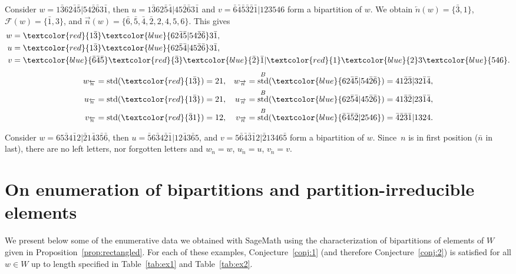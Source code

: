 \documentclass[ALCO,Unicode]{cedram}
\theoremstyle{definition}
\DeclareMathOperator{\std}{std}
\newcommand{\R}{{\overrightarrow{n}}}
\newcommand{\LL}{{\overleftarrow{n}}}
\newcommand{\Bstd}{\std^{B}}
\newcommand{\F}{\mathcal{F}}
\newcommand{\red}[1]{\textcolor{red}{#1}}
\newcommand{\blue}[1]{\textcolor{blue}{#1}}
\begin{document}
\begin{ex}
\label{ex:typeB-neg1}
Consider $w = 1 \bar{3} 6 2 \bar{4} \bar{5} | 5 4 \bar{2} \bar{6} 3 \bar{1}$, then $u = 1 \bar{3} 6 2 \bar{5} \bar{4} | 4 5 \bar{2} \bar{6} 3 \bar{1}$ and $v = \bar{6} \bar{4} \bar{5} \bar{3} \bar{2} \bar{1} | 1 2 3 5 4 6$ form a bipartition of $w$.  We obtain $\LL(w) = \lbrace \bar{3}, 1 \rbrace$, $\F(w) = \lbrace \bar{1}, 3 \rbrace$, and $\R(w) = \lbrace \bar{6}, \bar{5}, \bar{4}, \bar{2}, 2, 4, 5, 6 \rbrace$. This gives
\begin{align*}
w &= \red{1 \bar{3}} \blue{ 6 2 \bar{4} \bar{5} | 5 4 \bar{2} \bar{6}} 3 \bar{1}, \\
u &= \red{1 \bar{3}} \blue{ 6 2 \bar{5} \bar{4} | 4 5 \bar{2} \bar{6}} 3 \bar{1}, \\
v &= \blue{\bar{6} \bar{4} \bar{5}} \red{\bar{3}} \blue{\bar{2}} \bar{1} | \red{1} \blue{2} 3 \blue{5 4 6}.
\end{align*}
\begin{align*}
w_\LL &= \std(\red{1 \bar{3}}) = 2 1, & w_\R &= \Bstd(\blue{6 2 \bar{4} \bar{5} | 5 4 \bar{2} \bar{6}}) = 4 1 \bar{2} \bar{3} | 3 2 \bar{1} \bar{4}, \\
u_\LL &= \std(\red{1 \bar{3}}) = 2 1, & u_\R &= \Bstd(\blue{6 2 \bar{5} \bar{4} | 4 5 \bar{2} \bar{6}}) = 4 1 \bar{3} \bar{2} | 2 3 \bar{1} \bar{4}, \\
v_\LL &= \std(\red{\bar{3} 1}) = 1 2, & v_\R &= \Bstd(\blue{\bar{6} \bar{4} \bar{5} \bar{2} | 2 5 4 6}) = \bar{4} \bar{2} \bar{3} \bar{1} | 1 3 2 4. 
\end{align*}
\end{ex}

\begin{ex}
\label{ex:typeB-neg2}
Consider $w = 6 5 \bar{3} 4 \bar{1} 2 | \bar{2} 1 \bar{4} 3 \bar{5} \bar{6}$, then $u = \bar{5} 6 \bar{3} 4 \bar{2} \bar{1} | 1 2 \bar{4} 3 \bar{6} 5$, and $v = 5 \bar{6} \bar{4} \bar{3} \bar{1} 2 | \bar{2} 1 3 4 6 \bar{5}$ form a bipartition of $w$.  Since~$n$ is in first position ($\bar{n}$ in last), there are no left letters, nor forgotten letters and $w_\LL = w$, $u_\LL =u$, $v_\LL = v$.
\end{ex}


\section{On  enumeration of bipartitions and partition-irreducible elements}\label{ss:Computations}

We present below some of the enumerative data we obtained with SageMath using the characterization of bipartitions of elements of $W$ given in Proposition~\ref{prop:rectangled}. For each of these examples, Conjecture~\ref{conj:1} (and therefore Conjecture~\ref{conj:2}) is satisfied for all $w\in W$ up to length specified in Table~\ref{tab:ex1} and Table~\ref{tab:ex2}. 
\end{document}
